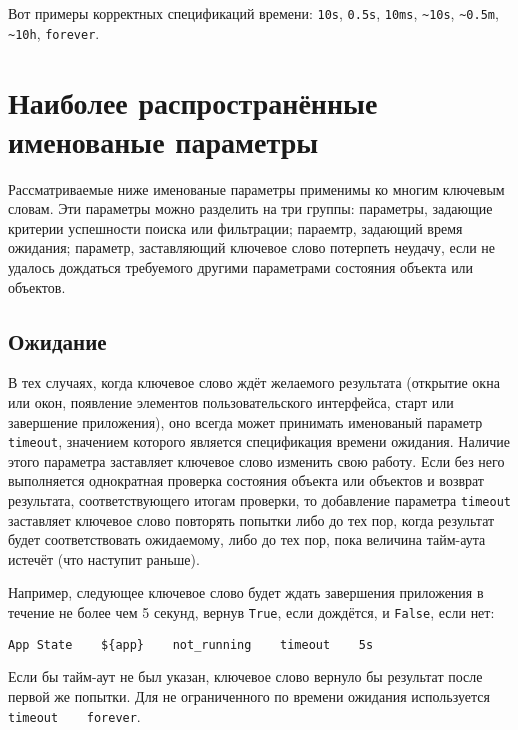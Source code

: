 \documentclass[11pt]{book} %
\begin{document}
Вот примеры корректных спецификаций времени: \verb"10s", \verb"0.5s", \verb"10ms", \verb"~10s", \verb"~0.5m", \verb"~10h",  \verb"forever".

\section{Наиболее распространённые именованые параметры}
Рассматриваемые ниже именованые параметры применимы ко многим ключевым словам. Эти параметры можно разделить на три группы: параметры, задающие критерии успешности поиска или фильтрации; параемтр, задающий время ожидания; параметр, заставляющий ключевое слово потерпеть неудачу, если не удалось дождаться требуемого другими параметрами состояния объекта или объектов.

\subsection{Ожидание}

В тех случаях, когда ключевое слово ждёт желаемого результата (открытие окна или окон, появление элементов пользовательского интерфейса, старт или завершение приложения), оно всегда может принимать именованый параметр \verb|timeout|, значением которого является спецификация времени ожидания. Наличие этого параметра заставляет ключевое слово изменить свою работу. Если без него выполняется однократная проверка состояния объекта или объектов и возврат результата, соответствующего итогам проверки, то добавление параметра \verb|timeout| заставляет ключевое слово повторять попытки либо до тех пор, когда результат будет соответствовать ожидаемому, либо до тех пор, пока величина тайм-аута истечёт (что наступит раньше).

Например, следующее ключевое слово будет ждать завершения приложения в течение не более чем 5 секунд, вернув \verb|True|, если дождётся, и \verb|False|, если нет:
\begin{verbatim}
App State    ${app}    not_running    timeout    5s
\end{verbatim}

Если бы тайм-аут не был указан, ключевое слово вернуло бы результат после первой же попытки. Для не ограниченного по времени ожидания используется \verb|timeout    forever|.
\end{document}
